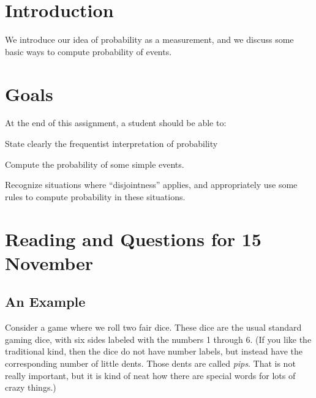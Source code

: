 \documentclass[12pt,letterpaper]{article}
\theoremstyle{definition}
\begin{document}
\setlength{\parskip}{1ex plus 0.5ex minus 0.2ex}
\setlength{\parindent}{0pt}

\pagestyle{fancy}
\cfoot{}

\section*{Introduction}
We introduce our idea of probability as a measurement, and we discuss some basic ways to compute probability of events.

\section*{Goals}
At the end of this assignment, a student should be able to:
\begin{compactitem}
\item State clearly the frequentist interpretation of probability
\item Compute the probability of some simple events.
\item Recognize situations where ``disjointness'' applies, and appropriately use some rules to compute probability in these situations.
\end{compactitem}

\section*{Reading and Questions for 15 November}

\subsection*{An Example}

Consider a game where we roll two fair dice. 
These dice are the usual standard gaming dice, with six sides labeled with the numbers 1 through 6. 
(If you like the traditional kind, then the dice do not have number labels, but instead have the corresponding number of little dents. 
Those dents are called \emph{pips}. 
That is not really important, but it is kind of neat how there are special words for lots of crazy things.)
\end{document}
